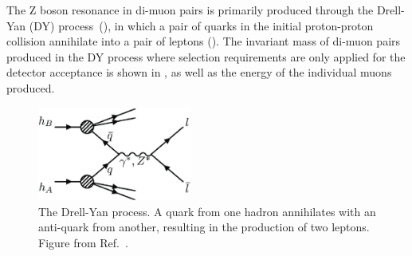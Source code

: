 The Z boson resonance in di-muon pairs is primarily produced through the Drell-Yan (DY) process~(\cite{origDYPaper,DYSummary}), in which a pair of quarks in the initial proton-proton collision annihilate into a pair of leptons ().
The invariant mass of di-muon pairs produced in the DY process where selection requirements are only applied for the detector acceptance is shown in , as well as the energy of the individual muons produced. 

\begin{figure}[ht]
	\centering
	\includegraphics[width=0.45\textwidth]{figures/dyProcess.pdf}
	\caption[Feynman Diagram for the DY Process]{The Drell-Yan process. A quark from one hadron annihilates with an anti-quark from another, resulting in the production of two leptons. Figure from Ref.~\cite{bechtel2023}.}
	\label{fig:dyDiagram}
\end{figure}

